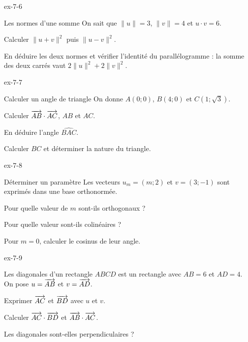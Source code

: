 \clearpage
{}
\begin{blocLivre}{ex-7-6}
\begin{exercice}[2]{Les normes d'une somme}
On sait que $\|u\|=3$, $\|v\|=4$ et $u\cdot v=6$.\begin{questions}
\item Calculer $\|u+v\|^2$ puis $\|u-v\|^2$.
\item En déduire les deux normes et vérifier l’identité du parallélogramme : la somme des deux carrés vaut $2\|u\|^2+2\|v\|^2$.
\end{questions}

\label{figgeo-07-06-ex}
\end{exercice}
\end{blocLivre}
\begin{blocLivre}{ex-7-7}
\begin{exercice}[2]{Calculer un angle de triangle}
On donne $A(0;0)$, $B(4;0)$ et $C(1;\sqrt3)$.\begin{questions}
\item Calculer $\overrightarrow{AB}\cdot\overrightarrow{AC}$, $AB$ et $AC$.
\item En déduire l’angle $\widehat{BAC}$.
\item Calculer $BC$ et déterminer la nature du triangle.
\end{questions}

\label{figgeo-07-07-ex}
\end{exercice}
\end{blocLivre}
\begin{blocLivre}{ex-7-8}
\begin{exercice}[2]{Déterminer un paramètre}
Les vecteurs $u_m=(m;2)$ et $v=(3;-1)$ sont exprimés dans une base orthonormée.\begin{questions}
\item Pour quelle valeur de $m$ sont-ils orthogonaux ?
\item Pour quelle valeur sont-ils colinéaires ?
\item Pour $m=0$, calculer le cosinus de leur angle.
\end{questions}

\label{figgeo-07-08-ex}
\end{exercice}
\end{blocLivre}
\begin{blocLivre}{ex-7-9}
\begin{exercice}[2]{Les diagonales d'un rectangle}
$ABCD$ est un rectangle avec $AB=6$ et $AD=4$. On pose $u=\overrightarrow{AB}$ et $v=\overrightarrow{AD}$.\begin{questions}
\item Exprimer $\overrightarrow{AC}$ et $\overrightarrow{BD}$ avec $u$ et $v$.
\item Calculer $\overrightarrow{AC}\cdot\overrightarrow{BD}$ et $\overrightarrow{AB}\cdot\overrightarrow{AC}$.
\item Les diagonales sont-elles perpendiculaires ?
\end{questions}

\label{figgeo-07-09-ex}
\end{exercice}
\end{blocLivre}

